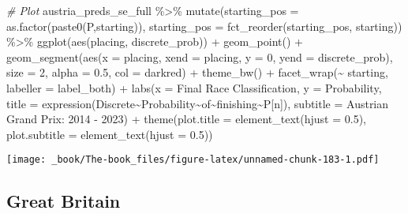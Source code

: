 \documentclass[
]{book}
\newenvironment{Shaded}{\begin{snugshade}}{\end{snugshade}}
\newcommand{\AttributeTok}[1]{\textcolor[rgb]{0.77,0.63,0.00}{#1}}
\newcommand{\CommentTok}[1]{\textcolor[rgb]{0.56,0.35,0.01}{\textit{#1}}}
\newcommand{\DecValTok}[1]{\textcolor[rgb]{0.00,0.00,0.81}{#1}}
\newcommand{\FloatTok}[1]{\textcolor[rgb]{0.00,0.00,0.81}{#1}}
\newcommand{\FunctionTok}[1]{\textcolor[rgb]{0.00,0.00,0.00}{#1}}
\newcommand{\NormalTok}[1]{#1}
\newcommand{\SpecialCharTok}[1]{\textcolor[rgb]{0.00,0.00,0.00}{#1}}
\newcommand{\StringTok}[1]{\textcolor[rgb]{0.31,0.60,0.02}{#1}}
\begin{document}
\begin{Shaded}
\begin{Highlighting}[]
\CommentTok{\# Plot}
\NormalTok{austria\_preds\_se\_full }\SpecialCharTok{\%\textgreater{}\%}
  \FunctionTok{mutate}\NormalTok{(}\AttributeTok{starting\_pos =} \FunctionTok{as.factor}\NormalTok{(}\FunctionTok{paste0}\NormalTok{(}\StringTok{\textquotesingle{}P\textquotesingle{}}\NormalTok{,starting)),}
         \AttributeTok{starting\_pos =} \FunctionTok{fct\_reorder}\NormalTok{(starting\_pos, starting)) }\SpecialCharTok{\%\textgreater{}\%}
  \FunctionTok{ggplot}\NormalTok{(}\FunctionTok{aes}\NormalTok{(placing, discrete\_prob)) }\SpecialCharTok{+}
  \FunctionTok{geom\_point}\NormalTok{() }\SpecialCharTok{+}
  \FunctionTok{geom\_segment}\NormalTok{(}\FunctionTok{aes}\NormalTok{(}\AttributeTok{x =}\NormalTok{ placing, }\AttributeTok{xend =}\NormalTok{ placing, }\AttributeTok{y =} \DecValTok{0}\NormalTok{, }\AttributeTok{yend =}\NormalTok{ discrete\_prob),}
               \AttributeTok{size =} \DecValTok{2}\NormalTok{, }\AttributeTok{alpha =} \FloatTok{0.5}\NormalTok{, }\AttributeTok{col =} \StringTok{\textquotesingle{}darkred\textquotesingle{}}\NormalTok{) }\SpecialCharTok{+}
  \FunctionTok{theme\_bw}\NormalTok{() }\SpecialCharTok{+}
  \FunctionTok{facet\_wrap}\NormalTok{(}\SpecialCharTok{\textasciitilde{}}\NormalTok{ starting, }\AttributeTok{labeller =}\NormalTok{ label\_both) }\SpecialCharTok{+}
  \FunctionTok{labs}\NormalTok{(}\AttributeTok{x =} \StringTok{\textquotesingle{}Final Race Classification\textquotesingle{}}\NormalTok{,}
       \AttributeTok{y =} \StringTok{\textquotesingle{}Probability\textquotesingle{}}\NormalTok{,}
       \AttributeTok{title =} \FunctionTok{expression}\NormalTok{(Discrete}\SpecialCharTok{\textasciitilde{}}\NormalTok{Probability}\SpecialCharTok{\textasciitilde{}}\NormalTok{of}\SpecialCharTok{\textasciitilde{}}\NormalTok{finishing}\SpecialCharTok{\textasciitilde{}}\NormalTok{P[n]),}
       \AttributeTok{subtitle =} \StringTok{\textquotesingle{}Austrian Grand Prix: 2014 {-} 2023\textquotesingle{}}\NormalTok{) }\SpecialCharTok{+}
  \FunctionTok{theme}\NormalTok{(}\AttributeTok{plot.title =} \FunctionTok{element\_text}\NormalTok{(}\AttributeTok{hjust =} \FloatTok{0.5}\NormalTok{),}
        \AttributeTok{plot.subtitle =} \FunctionTok{element\_text}\NormalTok{(}\AttributeTok{hjust =} \FloatTok{0.5}\NormalTok{)) }
\end{Highlighting}
\end{Shaded}

\texttt{[image: \_book/The-book\_files/figure-latex/unnamed-chunk-183-1.pdf]}

\hypertarget{great-britain}{%
\subsection{Great Britain}\label{great-britain}}
\end{document}
